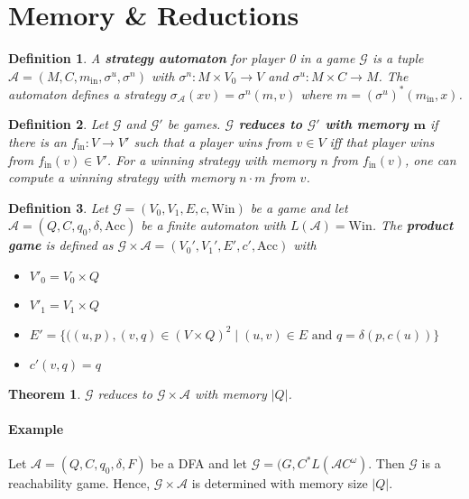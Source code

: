 \documentclass{article}
\newtheorem{theorem}{Theorem}
\newtheorem{definition}{Definition}
\begin{document}
\newpage

\section{Memory \& Reductions}
\begin{definition}
	A \textbf{strategy automaton} for player 0 in a game $\mathcal{G}$ is a tuple $\mathcal{A} = (M, C, m_\text{in}, \sigma^u, \sigma^n)$ with $\sigma^n : M \times V_0 \rightarrow V$ and $\sigma^u : M \times C \rightarrow M$. The automaton defines a strategy $\sigma_\mathcal{A}(xv) = \sigma^n(m, v)$ where $m = (\sigma^u)^*(m_\text{in}, x)$.
\end{definition}

\begin{definition}
	Let $\mathcal{G}$ and $\mathcal{G}'$ be games. \textbf{$\boldsymbol{\mathcal{G}}$ reduces to $\boldsymbol{\mathcal{G}'}$ with memory $\boldsymbol{m}$} if there is an $f_\text{in} : V \rightarrow V'$ such that a player wins from $v \in V$ iff that player wins from $f_\text{in}(v) \in V'$. For a winning strategy with memory $n$ from $f_\text{in}(v)$, one can compute a winning strategy with memory $n \cdot m$ from $v$.
\end{definition}

\begin{definition}
	Let $\mathcal{G} = (V_0, V_1, E, c, \text{Win})$ be a game and let $\mathcal{A} = (Q, C, q_0, \delta, \text{Acc})$ be a finite automaton with $L(\mathcal{A}) = \text{Win}$. The \textbf{product game} is defined as $\mathcal{G} \times \mathcal{A} = (V_0', V_1', E', c', \text{Acc})$ with
	\begin{itemize}
		\item $V'_0 = V_0 \times Q$
		\item $V'_1 = V_1 \times Q$
		\item $E' = \{ ((u, p), (v, q) \in (V \times Q)^2 \mid (u,v) \in E \text{ and } q = \delta(p, c(u)) \}$
		\item $c'(v, q) = q$
	\end{itemize}
\end{definition}

\begin{theorem}
	$\mathcal{G}$ reduces to $\mathcal{G} \times \mathcal{A}$ with memory $|Q|$.
\end{theorem}

\paragraph{Example}
	Let $\mathcal{A} = (Q, C, q_0, \delta, F)$ be a DFA and let $\mathcal{G} = (G, C^* L(\mathcal{A} C^\omega)$. Then $\mathcal{G}$ is a reachability game. Hence, $\mathcal{G} \times \mathcal{A}$ is determined with memory size $|Q|$.
\end{document}
